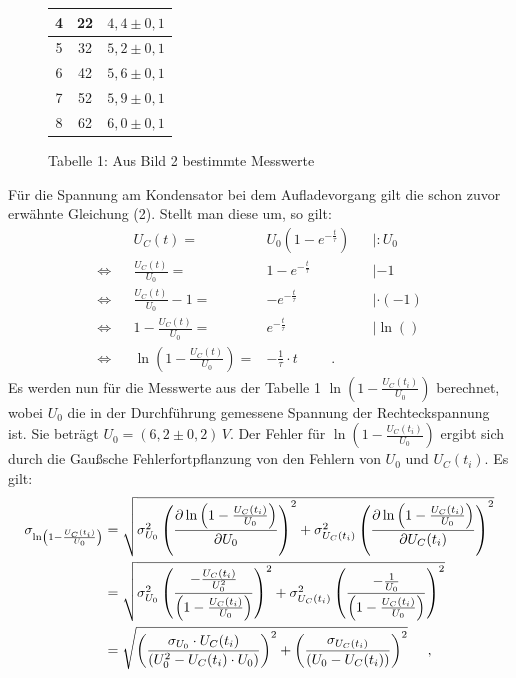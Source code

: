 \begin{figure}[h]
\begin{minipage}[h]{0.45\linewidth}
\begin{tabular}{|c|c|c|}
            \hline
            4 & 22 & $4,4\pm0,1$ \\
            \hline
            5 & 32 & $5,2\pm0,1$ \\
            \hline
            6 & 42 & $5,6\pm0,1$ \\
            \hline
            7 & 52 & $5,9\pm0,1$ \\
            \hline
            8 & 62 & $6,0\pm0,1$ \\
            \hline
        \end{tabular}
        \caption*{Tabelle 1: \small Aus Bild 2 bestimmte Messwerte}
    \end{minipage}
\end{figure}

Für die Spannung am Kondensator bei dem Aufladevorgang gilt die schon zuvor erwähnte Gleichung (2). Stellt man diese um, so gilt:
\begin{align}
    &&U_C(t) =&U_0 \left( 1-e^{-\frac{t}{\tau}} \right) && |:U_0\nonumber \\
    \Leftrightarrow &&\frac{U_C(t)}{U_0} =& 1-e^{-\frac{t}{\tau}} && |-1 \nonumber \\
    \Leftrightarrow &&\frac{U_C(t)}{U_0} -1 =& -e^{-\frac{t}{\tau}} && |\cdot(-1)\nonumber \\
    \Leftrightarrow && 1-\frac{U_C(t)}{U_0} =& e^{-\frac{t}{\tau}} && |\ln()\nonumber \\
    \Leftrightarrow && \ln\left(1-\frac{U_C(t)}{U_0}\right) =& -\frac{1}{\tau} \cdot t \hspace{1cm}.
\end{align}
Es werden nun für die Messwerte aus der Tabelle 1 $\ln\left(1-\frac{U_C(t_i)}{U_0}\right)$ berechnet, wobei $U_0$ die in der Durchführung gemessene Spannung der Rechteckspannung ist. Sie beträgt $U_0=(6,2 \pm 0,2)\,V$. Der Fehler für $\ln\left(1-\frac{U_C(t_i)}{U_0}\right)$ ergibt sich durch die Gaußsche Fehlerfortpflanzung von den Fehlern von $U_0$ und $U_C(t_i)$. Es gilt:
\begin{align*}
    \sigma_{\ln\left(1-\frac{U_C(t_i)}{U_0}\right)}
&=\sqrt{\sigma_{U_0}^2 \left(\frac{\partial \ln\left(1-\frac{U_C(t_i)}{U_0}\right)}{\partial U_0}\right)^2 + \sigma_{U_C(t_i)}^2 \left(\frac{\partial \ln\left(1-\frac{U_C(t_i)}{U_0}\right)}{\partial U_C(t_i)}\right)^2 }\\
&=\sqrt{\sigma_{U_0}^2 \left(\frac{-\frac{U_C(t_i)}{U_0^2}}{\left(1-\frac{U_C(t_i)}{U_0}\right)}\right)^2 + \sigma_{U_C(t_i)}^2 \left(\frac{-\frac{1}{U_0}}{\left(1-\frac{U_C(t_i)}{U_0}\right)}\right)^2 }\\
&=\sqrt{ \left(\frac{\sigma_{U_0}\cdot U_C(t_i)}{\left(U_0^2-U_C(t_i) \cdot U_0\right)}\right)^2 +  \left(\frac{\sigma_{U_C(t_i)}}{\left(U_0-U_C(t_i)\right)}\right)^2 }\hspace{0.5cm},
\end{align*}
